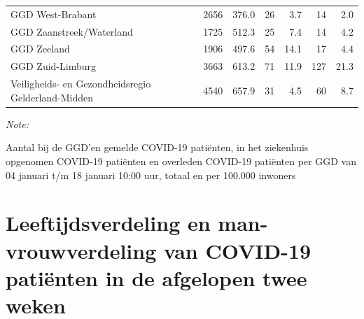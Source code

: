 \documentclass[
  english,
  man,floatsintext]{apa6}
\begin{document}
\begin{table}[H]
\begin{threeparttable}
\begin{tabular}{lrrrrrr}
GGD West-Brabant & 2656 & 376.0 & 26 & 3.7 & 14 & 2.0\\
GGD Zaanstreek/Waterland & 1725 & 512.3 & 25 & 7.4 & 14 & 4.2\\
GGD Zeeland & 1906 & 497.6 & 54 & 14.1 & 17 & 4.4\\
GGD Zuid-Limburg & 3663 & 613.2 & 71 & 11.9 & 127 & 21.3\\
Veiligheids- en Gezondheidsregio Gelderland-Midden & 4540 & 657.9 & 31 & 4.5 & 60 & 8.7\\
\bottomrule
\end{tabular}
\begin{tablenotes}
\item \textit{Note: } 
\item Aantal bij de GGD’en gemelde COVID-19 patiënten, in het ziekenhuis opgenomen COVID-19 patiënten en overleden COVID-19 patiënten per GGD van 04 januari t/m 18 januari 10:00 uur, totaal en per 100.000 inwoners
\end{tablenotes}
\end{threeparttable}
\endgroup{}
\end{table}

\newpage

\hypertarget{leeftijdsverdeling-en-man-vrouwverdeling-van-covid-19-patiuxebnten-in-de-afgelopen-twee-weken}{%
\section{Leeftijdsverdeling en man-vrouwverdeling van COVID-19 patiënten in de afgelopen twee weken}\label{leeftijdsverdeling-en-man-vrouwverdeling-van-covid-19-patiuxebnten-in-de-afgelopen-twee-weken}}
\end{document}
